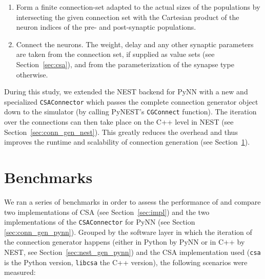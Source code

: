 \documentclass{frontiersSCNS} %
\begin{document}
\begin{enumerate}
\item Form a finite connection-set adapted to the actual sizes of the
  populations by intersecting the given connection set with the
  Cartesian product of the neuron indices of the pre- and
  post-synaptic populations.
\item Connect the neurons. The weight, delay and any other synaptic
  parameters are taken from the connection set, if supplied as value
  sets (see Section~\ref{sec:csa}), and from the parameterization of
  the synapse type otherwise.
\end{enumerate}

During this study, we extended the NEST backend for PyNN with a new
and specialized \verb|CSAConnector| which passes the complete
connection generator object down to the simulator (by calling PyNEST's
\verb|CGConnect| function). The iteration over the connections can
then take place on the C++ level in NEST (see
Section~\ref{sec:conn_gen_nest}). This greatly reduces the overhead
and thus improves the runtime and scalability of connection generation
(see Section~\ref{sec:benchmarks}).


\section{Benchmarks}\label{sec:benchmarks}

We ran a series of benchmarks in order to assess the performance of
and compare two implementations of CSA (see Section~\ref{sec:impl})
and the two implementations of the \verb|CSAConnector| for PyNN (see
Section \ref{sec:conn_gen_pynn}). Grouped by the software layer in
which the iteration of the connection generator happens (either in
Python by PyNN or in C++ by NEST, see Section~\ref{sec:nest_gen_pynn})
and the CSA implementation used (\verb|csa| is the Python version,
\verb|libcsa| the C++ version), the following scenarios were measured:
\end{document}
